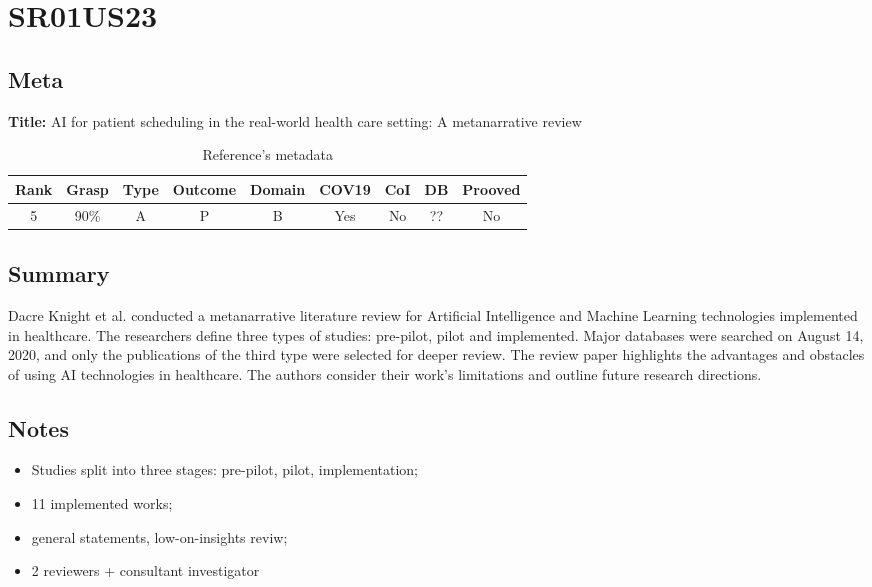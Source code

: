 \section{ SR01US23 }


\subsection{Meta}

    \textbf{Title:}
    AI for patient scheduling in the real-world health care setting: A metanarrative review

    \begin{table}[H]
        \centering
        \begin{tabular}{|c|c|c|c|c|c|c|c|c|}
            \hline
                \textbf{Rank} & \textbf{Grasp} & \textbf{Type} & \textbf{Outcome} & \textbf{Domain} & \textbf{COV19} & \textbf{CoI} & \textbf{DB} & \textbf{Prooved} \\
            \hline
                5 & 90\% & A & P & B & Yes & No & ?? & No \\
            \hline
        \end{tabular}
        \caption{Reference's metadata}
        \label{tab:SR01US23}
    \end{table}

\subsection{Summary}
    Dacre Knight et al. \cite{x034} conducted a metanarrative literature review for Artificial Intelligence and Machine Learning technologies implemented in healthcare. The researchers define three types of studies: pre-pilot, pilot and implemented. Major databases were searched on August 14, 2020, and only the publications of the third type were selected for deeper review. The review paper highlights the advantages and obstacles of using AI technologies in healthcare. The authors consider their work's limitations and outline future research directions. 

\subsection{Notes}
    \begin{itemize}
        \item Studies split into three stages: pre-pilot, pilot, implementation;
        \item 11 implemented works;
        \item general statements, low-on-insights reviw;
        \item 2 reviewers + consultant investigator
    \end{itemize}


